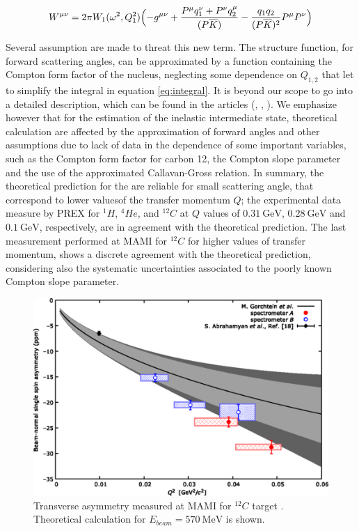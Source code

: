 \begin{equation}
W^{\mu \nu} = 2 \pi W_{1}(\omega^{2},Q_{1}^{2}) \Bigl( -g^{\mu \nu} + \dfrac{P^{\mu}q_{1}^{\nu} +  P^{\nu}q_{2}^{\mu}}{(P \overline{K})} - \dfrac{q_{1} q_{2}}{(P \overline{K})^{2}}P^{\mu}P^{\nu} \Bigl)
\end{equation}

Several assumption are made to threat this new term. The structure function, for forward scattering angles, can be approximated by a function containing the Compton form factor of the nucleus, neglecting some dependence on $Q_{1,2}$ that let to simplify the integral in equation \ref{eq:integral}. It is beyond our scope to go into a detailed description, which can be found in the articles (\cite{Gorchtein_2006}, \cite{Gorchtein_2008}, \cite{Koshchii_2021}). We emphasize however that for the estimation of the inelastic intermediate state, theoretical calculation are affected by the approximation of forward angles and other assumptions due to lack of data in the dependence of some important variables, such as the Compton form factor for carbon 12, the Compton slope parameter and the use of the approximated Callavan-Gross relation. In summary, the theoretical prediction for the \transv are reliable for small scattering angle, that correspond to lower values ​​of the transfer momentum $Q$; the experimental data measure by PREX \cite{HAPPEX:2012fud} for $^{1}H$, $^{4}He$, and $^{12}C$ at $Q$ values of $\SI{0.31}{\giga \electronvolt}$, $\SI{0.28}{\giga \electronvolt}$ and $\SI{0.1}{\giga \electronvolt}$, respectively, are in agreement with the theoretical prediction. The last measurement performed at MAMI for $^{12}C$ \cite{Esser:2018vdp} for higher values of transfer momentum, shows a discrete agreement with the theoretical prediction, considering also the systematic uncertainties associated to the poorly known Compton slope parameter.
\newline

\begin{figure}[hbtp]
\centering
\includegraphics[scale = 0.5]{Transverse/medium.png}
\caption{Transverse asymmetry measured at MAMI for $^{12}C$ target \cite{Esser:2018vdp}. Theoretical calculation for $E_{beam} = \SI{570}{\mega \electronvolt}$  is shown.}
\end{figure}

